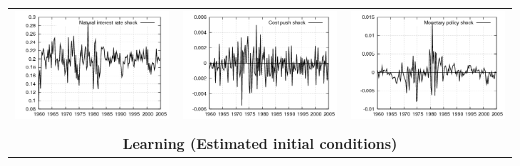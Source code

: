 \documentclass{beamer}
\begin{document}
{\begin{center}
\begin{tabular}{ccc}
  \includegraphics[scale=0.23]{plots2/re_natint.png} & \includegraphics[scale=0.23]{plots2/re_costpush.png} & \includegraphics[scale=0.23]{plots2/re_mpshock.png} \\ \\
  \multicolumn{3}{c}{\textbf{Learning  (Estimated initial conditions)}}  \\

\end{tabular}
\end{center}}
\end{document}
